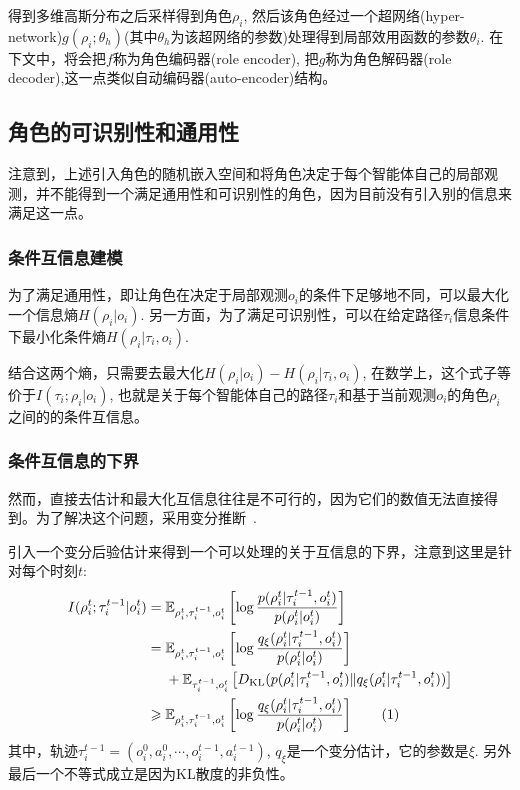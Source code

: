 得到多维高斯分布之后采样得到角色$\rho_i$, 然后该角色经过一个超网络(hyper-network)$g(\rho_i;\theta_h)$(其中$\theta_h$为该超网络的参数)处理得到局部效用函数的参数$\theta_i$. 在下文中，将会把$f$称为角色编码器(role encoder), 把$g$称为角色解码器(role decoder),这一点类似自动编码器(auto-encoder)结构。

\subsection{角色的可识别性和通用性}
注意到，上述引入角色的随机嵌入空间和将角色决定于每个智能体自己的局部观测，并不能得到一个满足通用性和可识别性的角色，因为目前没有引入别的信息来满足这一点。

\subsubsection{条件互信息建模}
为了满足通用性，即让角色在决定于局部观测$o_i$的条件下足够地不同，可以最大化一个信息熵$H(\rho_i|o_i)$. 另一方面，为了满足可识别性，可以在给定路径$\tau_i$信息条件下最小化条件熵$H(\rho_i | \tau_i, o_i)$.

结合这两个熵，只需要去最大化$H(\rho_i | o_i) - H(\rho_i | \tau_i, o_i)$, 在数学上，这个式子等价于$I(\tau_i; \rho_i | o_i)$, 也就是关于每个智能体自己的路径$\tau_i$和基于当前观测$o_i$的角色$\rho_i$之间的的条件互信息。

\subsubsection{条件互信息的下界}
然而，直接去估计和最大化互信息往往是不可行的，因为它们的数值无法直接得到。为了解决这个问题，采用变分推断~\cite{wainwright2008graphical, alemi2017deep}.

引入一个变分后验估计来得到一个可以处理的关于互信息的下界，注意到这里是针对每个时刻$t$:
\begin{align*}
    I(\rho^t_i; \tau^{t-1}_i | o^t_i) & = \mathbb{E}_{\rho^t_i, \tau^{t-1}_i, o^t_i}\left[\log\frac{p(\rho^t_i | \tau^{t-1}_i, o^t_i)}{p(\rho^t_i | o^t_i)}\right] \\
    & = \mathbb{E}_{\rho^t_i, \tau^{t-1}_i, o^t_i}\left[\log\frac{q_\xi(\rho^t_i | \tau^{t-1}_i, o^t_i)}{p(\rho^t_i | o^t_i)}\right] \\ & \ \ \ \ + \mathbb{E}_{\tau^{t-1}_i, o^t_i}\left[\KL(p(\rho^t_i|\tau^{t-1}_i, o^t_i) \| q_\xi(\rho^t_i|\tau^{t-1}_i, o^t_i))\right] \\
    & \ge  \mathbb{E}_{\rho^t_i, \tau^{t-1}_i, o^t_i}\left[\log\frac{q_\xi(\rho^t_i | \tau^{t-1}_i, o^t_i)}{p(\rho^t_i | o^t_i)}\right]\stepcounter{equation}\tag{\theequation}
    \label{equ:mi}
 \end{align*}
其中，轨迹$\tau^{t-1}_i=(o_i^0, a_i^0, \cdots, o_i^{t-1}, a_i^{t-1})$, $q_\xi$是一个变分估计，它的参数是$\xi$. 另外最后一个不等式成立是因为KL散度的非负性。

